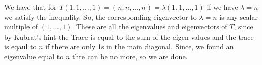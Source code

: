 \documentclass[10pt, twocolumn]{article}
\begin{document}
\begin{q}[19]
	We have that for $ T(1, 1, ..., 1) = (n, n , ..., n) = \lambda (1, 1, ..., 1) $ if we have $ \lambda = n $ we satisfy the inequality.
	So, the corresponding eigenvector to $ \lambda = n $ is any scalar multiple of $ (1, ..., 1) $. 
	These are all the eigenvalues and eigenvectors of $ T $, since by Kubrat's hint the Trace is equal to the sum of the eigen values and the trace is eqaul to $ n $ if there are only 1s in the main diagonal. 
	Since, we found an eigenvalue equal to $ n $ thre can be no more, so we are done. 
\end{q}
\end{document}
